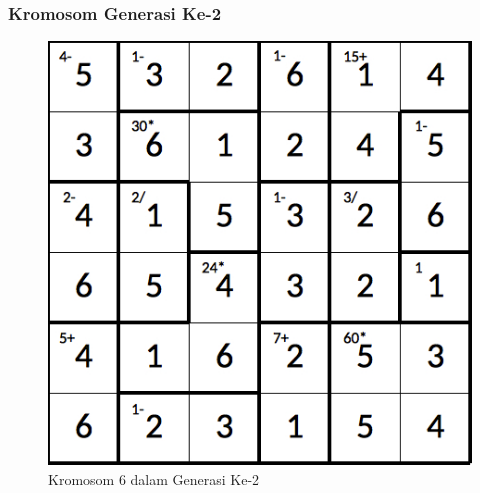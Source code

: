\documentclass{beamer}
\begin{document}
\note{

}

\begin{frame}
\frametitle{Kromosom Generasi Ke-2}
\begin{figure}
\centering
\captionsetup{justification=centering}
\includegraphics[scale=0.333]{Gambar/hybridgenetic/Generation2Chromosome6}
\caption[Kromosom 6 dalam Generasi Ke-2]{Kromosom 6 dalam Generasi Ke-2}
\label{fig:analisisg2k6}
\end{figure}
\end{frame}

\note{

}
\end{document}
